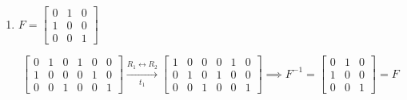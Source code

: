 \begin{enumerate}[label=\alph*)]
\begin{answer}
    $$
    \left[
    \begin{array}{ccc|ccc}
        1 & 0 & 4 & 1 & 0 & 0\\
        0 & 1 & 0 & 0 & 1 & 0\\
        0 & 0 & 1 & 0 & 0 & 1
    \end{array}
    \right]
    \xrightarrow{R_1\leftarrow R_1-4R_3}
    \left[
    \begin{array}{ccc|ccc}
        1 & 0 & 0 & 1 & 0 & -4\\
        0 & 1 & 0 & 0 & 1 & 0\\
        0 & 0 & 1 & 0 & 0 & 1
    \end{array}
    \right] \implies
    \boxed{
    E^{-1}=
    \begin{bmatrix}
        1 & 0 & -4\\
        0 & 1 & 0\\
        0 & 0 & 1
    \end{bmatrix}
    }.
    $$
\end{answer}

\item
$F=
\begin{bmatrix}
    0 & 1 & 0\\
    1 & 0 & 0\\
    0 & 0 & 1
\end{bmatrix}
$

\begin{answer}
    $$
    \left[
    \begin{array}{ccc|ccc}
        0 & 1 & 0 & 1 & 0 & 0\\
        1 & 0 & 0 & 0 & 1 & 0\\
        0 & 0 & 1 & 0 & 0 & 1
    \end{array}
    \right]
    \xrightarrow[t_1]{R_1\leftrightarrow R_2}
    \left[
    \begin{array}{ccc|ccc}
        1 & 0 & 0 & 0 & 1 & 0\\
        0 & 1 & 0 & 1 & 0 & 0\\
        0 & 0 & 1 & 0 & 0 & 1
    \end{array}
    \right]
    \implies
    \boxed{
    F^{-1}=
    \begin{bmatrix}
        0 & 1 & 0\\
        1 & 0 & 0\\
        0 & 0 & 1
    \end{bmatrix}
    =F
    }
    $$
\end{answer}



\end{enumerate}
